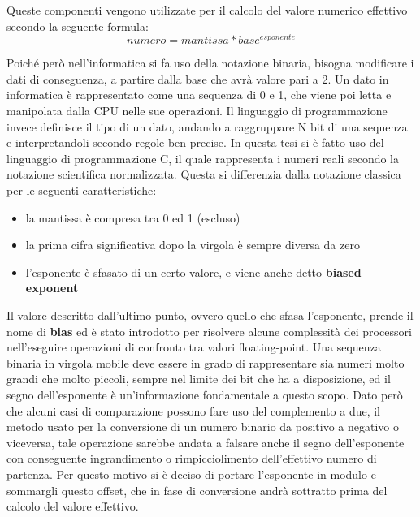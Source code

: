 \documentclass[Lau, oneside]{sapthesis}%
\begin{document}
Queste componenti vengono utilizzate per il calcolo del valore numerico effettivo secondo la seguente formula:
\begin{equation}
    numero = mantissa * base ^ {esponente}    
    \label{eq:conversione_scientifica}
\end{equation}

Poiché però nell'informatica si fa uso della notazione binaria, bisogna modificare i dati di conseguenza, a partire dalla base che avrà valore pari a 2.
\newline \newline
Un dato in informatica è rappresentato come una sequenza di 0 e 1, che viene poi letta e manipolata dalla CPU nelle sue operazioni. 
\newline
Il linguaggio di programmazione invece definisce il tipo di un dato, andando a raggruppare N bit di una sequenza e interpretandoli secondo regole ben precise.
\newline \newline \newline
In questa tesi si è fatto uso del linguaggio di programmazione C, il quale rappresenta i numeri reali secondo la notazione scientifica normalizzata.
\newline
Questa si differenzia dalla notazione classica per le seguenti caratteristiche: 
\begin{itemize}
    \item la mantissa è compresa tra 0 ed 1 (escluso)
    \item la prima cifra significativa dopo la virgola è sempre diversa da zero
    \item l'esponente è sfasato di un certo valore, e viene anche detto \textbf{biased exponent}
\end{itemize}

Il valore descritto dall'ultimo punto, ovvero quello che sfasa l'esponente, prende il nome di \textbf{bias} ed è stato introdotto per risolvere alcune complessità dei processori nell'eseguire operazioni di confronto tra valori floating-point.
\newline
Una sequenza binaria in virgola mobile deve essere in grado di rappresentare sia numeri molto grandi che molto piccoli, sempre nel limite dei bit che ha a disposizione, ed il segno dell'esponente è un'informazione fondamentale a questo scopo.
\newline
Dato però che alcuni casi di comparazione possono fare uso del complemento a due, il metodo usato per la conversione di un numero binario da positivo a negativo o viceversa, tale operazione sarebbe andata a falsare anche il segno dell'esponente con conseguente ingrandimento o rimpicciolimento dell'effettivo numero di partenza.
\newline
Per questo motivo si è deciso di portare l'esponente in modulo e sommargli questo offset, che in fase di conversione andrà sottratto prima del calcolo del valore effettivo.
\end{document}
